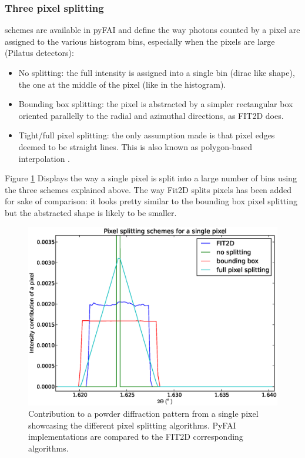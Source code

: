 \documentclass[preprint]{iucr}
\begin{document}
\subsubsection{Three pixel splitting} schemes are available in pyFAI and define
the way photons counted by a pixel are assigned to the various histogram bins,
especially when the pixels are large (Pilatus detectors):
\begin{itemize}
\item No splitting: the full intensity is assigned into a single bin (dirac
like shape), the one at the middle of the pixel (like in the histogram).
\item Bounding box splitting: the pixel is abstracted by a simpler rectangular box
oriented parallelly to the radial and azimuthal directions, as FIT2D does.
\item
Tight/full pixel splitting: the only assumption made is that pixel
edges deemed to be straight lines. This is also known as polygon-based
interpolation \cite{stefanvdw}.
\end{itemize}
Figure \ref{split} Displays the way a single pixel is split into a
large number of bins using the three schemes explained above.
The way Fit2D splits pixels has been added for sake of comparison: it looks
pretty similar to the bounding box pixel splitting but the abstracted shape is
likely to be smaller.

\begin{figure}
\label{split}
\begin{center}
\includegraphics[width=15cm]{splitpixel.eps}
\caption{Contribution to a powder diffraction pattern from a single pixel
showcasing the different pixel splitting algorithms. PyFAI implementations are
compared to the FIT2D corresponding algorithms.}
\end{center}
\end{figure}
\end{document}
